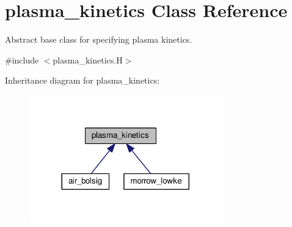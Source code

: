 \hypertarget{classplasma__kinetics}{}\section{plasma\+\_\+kinetics Class Reference}
\label{classplasma__kinetics}


Abstract base class for specifying plasma kinetics.  




{\ttfamily \#include $<$plasma\+\_\+kinetics.\+H$>$}



Inheritance diagram for plasma\+\_\+kinetics\+:\nopagebreak
\begin{figure}[H]
\begin{center}
\leavevmode
\includegraphics[width=236pt]{classplasma__kinetics__inherit__graph}
\end{center}
\end{figure}
